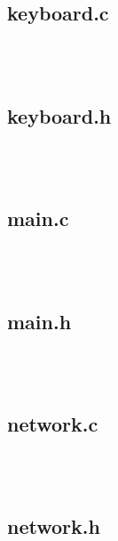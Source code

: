 \documentclass{article}
\begin{document}
\subsection*{keyboard.c}

\begin{verbatim}



\end{verbatim}

\subsection*{keyboard.h}

\begin{verbatim}



\end{verbatim}

\subsection*{main.c}

\begin{verbatim}



\end{verbatim}

\subsection*{main.h}

\begin{verbatim}



\end{verbatim}

\subsection*{network.c}

\begin{verbatim}



\end{verbatim}

\subsection*{network.h}

\begin{verbatim}



\end{verbatim}
\end{document}
